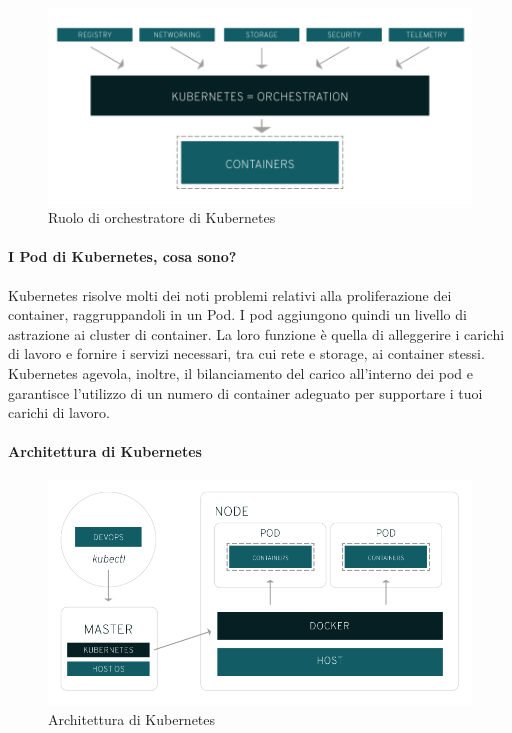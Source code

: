 \begin{figure}[h!]
	\centering
	\includegraphics[width=\textwidth,keepaspectratio=true]{capitoli/imgs/kubernetes-diagram.png}
	\caption{Ruolo di orchestratore di Kubernetes}
\end{figure}

\paragraph{I Pod di Kubernetes, cosa sono?}
Kubernetes risolve molti dei noti problemi relativi alla proliferazione dei container, raggruppandoli in un Pod. I pod aggiungono quindi un livello di astrazione ai cluster di container. La loro funzione è quella di alleggerire i carichi di lavoro e fornire i servizi necessari, tra cui rete e storage, ai container stessi. Kubernetes agevola, inoltre, il bilanciamento del carico all'interno dei pod e garantisce l'utilizzo di un numero di container adeguato per supportare i tuoi carichi di lavoro.

\paragraph{Architettura di Kubernetes}
\begin{figure}[h!]
	\centering
	\includegraphics[width=\textwidth,keepaspectratio=true]{capitoli/imgs/kubernetesarchitetcture.png}
	\caption{Architettura di Kubernetes}
\end{figure}

